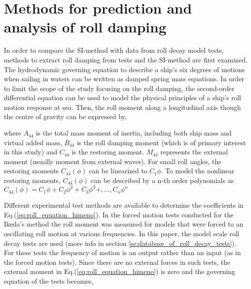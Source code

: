 \section{Methods for prediction and analysis of roll damping}
\label{se:methods_for_prediction_and_analysis}
In order to compare the SI-method with data from roll decay model tests, methods to extract roll damping from tests and the SI-method are first examined.
The hydrodynamic governing equation to describe a ship's six degrees of motions when sailing in waters can be written as damped spring mass equations. In order to limit the scope of the study focusing on the roll damping, the second-order differential equation can be used to model the physical principles of a ship's roll motion response at sea. Then, the roll moment along a longitudinal axis though the centre of gravity can be expressed by,

 

where $A_{44}$ is the total mass moment of inertia, including both ship mass and virtual added mass, $B_{44}$ is the roll damping moment (which is of primary interest in this study) and $C_{44}$ is the restoring moment. $M_{44}$ represents the external moment (usually moment from external waves). For small roll angles, the restoring moments $C_{44}(\phi)$ can be linearized to $C_{1}\phi$. To model the nonlinear restoring moments, $C_{44}(\phi)$ can be described by a n-th order polynomials as $C_{44}(\phi) = C_{1}\phi + C_{2}\phi^2 + C_{3}\phi^3 +, ..., C_{n}\phi^n $

Different experimental test methods are available to determine the coefficients in Eq.(\ref{eq:roll_equation_himeno}). In the forced motion tests conducted for the Ikeda's method the roll moment was measured for models that were forced to an oscillating roll motion at various frequencies. In this paper, the model scale roll decay tests are used (more info in section \ref{se:database_of_roll_decay_tests}). For these tests the frequency of motion is an output rather than an input (as in the forced motion tests).  Since there are no external forces in such tests, the external moment in Eq.(\ref{eq:roll_equation_himeno}) is zero and the governing equation of the tests becomes, 




